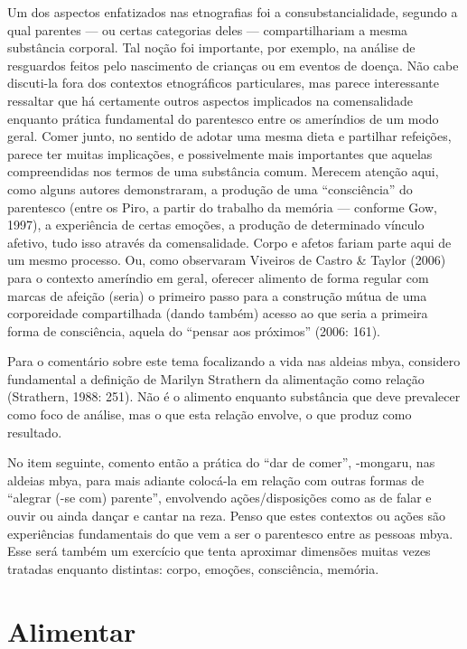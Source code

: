 Um dos aspectos enfatizados nas etnografias foi a consubstancialidade,
segundo a qual parentes — ou certas categorias deles — compartilhariam
a mesma substância corporal. Tal noção foi importante, por exemplo, na
análise de resguardos feitos pelo nascimento de crianças ou em eventos
de doença. Não cabe discuti-la fora dos contextos etnográficos
particulares, mas parece interessante ressaltar que há certamente
outros aspectos implicados na comensalidade enquanto prática
fundamental do parentesco entre os ameríndios de um modo geral. Comer
junto, no sentido de adotar uma mesma dieta e partilhar refeições,
parece ter muitas implicações, e possivelmente mais importantes que
aquelas compreendidas nos termos de uma substância comum. Merecem
atenção aqui, como alguns autores demonstraram, a produção de uma
``consciência'' do parentesco (entre os Piro, a partir do trabalho da
memória — conforme Gow, 1997), a experiência de certas emoções, a
produção de determinado vínculo afetivo, tudo isso através da
comensalidade. Corpo e afetos fariam parte aqui de um mesmo processo.
Ou, como observaram Viveiros de Castro \& Taylor (2006) para o contexto
ameríndio em geral, oferecer alimento de forma regular com marcas de
afeição (seria) o primeiro passo para a construção mútua de uma
corporeidade compartilhada (dando também) acesso ao que seria a
primeira forma de consciência, aquela do ``pensar aos próximos'' (2006:
161).

Para o comentário sobre este tema focalizando a vida nas aldeias mbya,
considero fundamental a definição de Marilyn Strathern da alimentação
como relação (Strathern, 1988: 251). Não é o alimento enquanto
substância que deve prevalecer como foco de análise, mas o que esta
relação envolve, o que produz como resultado.

No item seguinte, comento então a prática do ``dar de comer'', -mongaru,
nas aldeias mbya, para mais adiante colocá-la em relação com outras
formas de ``alegrar (-se com) parente'', envolvendo ações/disposições
como as de falar e ouvir ou ainda dançar e cantar na reza. Penso que
estes contextos ou ações são experiências fundamentais do que vem a ser
o parentesco entre as pessoas mbya. Esse será também um exercício que
tenta aproximar dimensões muitas vezes tratadas enquanto distintas:
corpo, emoções, consciência, memória.

\section{Alimentar}

